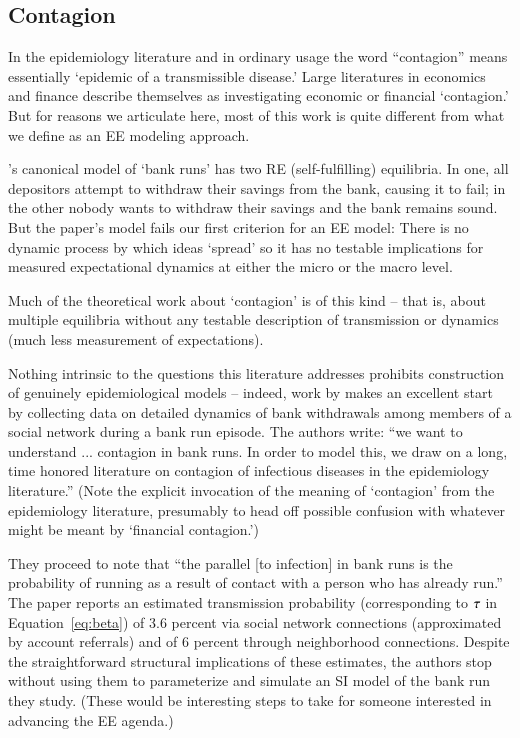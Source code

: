 
\subsection{Contagion}\label{subsec:Contagion}

In the epidemiology literature and in ordinary usage the word ``contagion'' means essentially `epidemic of a transmissible disease.'  Large literatures in economics and finance describe themselves as investigating economic or financial `contagion.'  But for reasons we articulate here, most of this work is quite different from what we define as an EE modeling approach.


\href{https://www.jstor.org/stable/1837095}{\cite{diamond_bank_1983}}'s canonical model of `bank runs' has two RE (self-fulfilling) equilibria.  In one, all depositors attempt to withdraw their savings from the bank, causing it to fail; in the other nobody wants to withdraw their savings and the bank remains sound.  But the paper's model fails our first criterion for an EE model: There is no dynamic process by which ideas `spread' so it has no testable implications for measured expectational dynamics at either the micro or the macro level.

Much of the theoretical work about `contagion' is of this kind -- that is, about multiple equilibria without any testable description of transmission or dynamics (much less measurement of expectations).

Nothing intrinsic to the questions this literature addresses prohibits construction of genuinely epidemiological models -- indeed, work by \cite{iyer2012understanding} makes an excellent start by collecting data on detailed dynamics of bank withdrawals among members of a social network during a bank run episode.  The authors write:
``we want to understand ... contagion in bank runs. In order to model this, we draw on a long, time honored literature on contagion of infectious diseases in the epidemiology literature.''   (Note the explicit invocation of the meaning of `contagion' from the epidemiology literature, presumably to head off possible confusion with whatever might be meant by `financial contagion.')

They proceed to note that ``the parallel [to infection] in bank runs is the probability of running as a result of contact with a person who has already run.''  The paper reports an estimated transmission probability (corresponding to  $\tau$ in Equation~\ref{eq:beta}) of 3.6 percent via social network connections (approximated by account referrals) and of 6 percent through neighborhood connections. Despite the straightforward structural implications of these estimates, the authors stop without using them to parameterize and simulate an SI model of the bank run they study. (These would be interesting steps to take for someone interested in advancing the EE agenda.)


